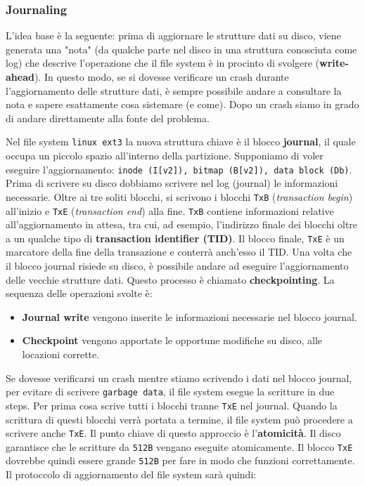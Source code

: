 \documentclass[12pt, letterpaper]{article}
\begin{document}
			\subsubsection{Journaling}
				L'idea base è la seguente: prima di aggiornare le strutture dati su disco, viene generata una "nota" (da qualche parte nel disco in una struttura conosciuta come log) che descrive l'operazione che il file system è in procinto di svolgere (\textbf{write-ahead}). In questo modo, se si dovesse verificare un crash durante l'aggiornamento delle strutture dati, è sempre possibile andare a consultare la nota e sapere esattamente cosa sistemare (e come). Dopo un crash siamo in grado di andare direttamente alla fonte del problema.
				
				Nel file system \texttt{linux ext3} la nuova struttura chiave è il blocco \textbf{journal}, il quale occupa un piccolo spazio all'interno della partizione. Supponiamo di voler eseguire l'aggiornamento: \texttt{inode (I[v2]), bitmap (B[v2]), data block (Db)}. Prima di scrivere su disco dobbiamo scrivere nel log (journal) le informazioni necessarie. Oltre ai tre soliti blocchi, si scrivono i blocchi \texttt{TxB} (\textit{transaction begin}) all'inizio e \texttt{TxE} (\textit{transaction end}) alla fine. \texttt{TxB} contiene informazioni relative all'aggiornamento in attesa, tra cui, ad esempio, l'indirizzo finale dei blocchi oltre a un qualche tipo di \textbf{transaction identifier (TID)}. Il blocco finale, \texttt{TxE} è un marcatore della fine della transazione e conterrà anch'esso il TID. Una volta che il blocco journal risiede su disco, è possibile andare ad eseguire l'aggiornamento delle vecchie strutture dati. Questo processo è chiamato \textbf{checkpointing}. La sequenza delle operazioni svolte è:
				\begin{itemize}
					\item \textbf{Journal write} vengono inserite le informazioni necessarie nel blocco journal.
					\item \textbf{Checkpoint} vengono apportate le opportune modifiche su disco, alle locazioni corrette. 
				\end{itemize}
				Se dovesse verificarsi un crash mentre stiamo scrivendo i dati nel blocco journal, per evitare di scrivere \texttt{garbage data}, il file system esegue la scritture in due steps. Per prima cosa scrive tutti i blocchi tranne \texttt{TxE} nel journal. Quando la scrittura di questi blocchi verrà portata a termine, il file system può procedere a scrivere anche \texttt{TxE}. Il punto chiave di questo approccio è l'\textbf{atomicità}. Il disco garantisce che le scritture da \texttt{512B} vengano eseguite atomicamente. Il blocco \texttt{TxE} dovrebbe quindi essere grande \texttt{512B} per fare in modo che funzioni correttamente. Il protoccolo di aggiornamento del file system sarà quindi:
\end{document}
